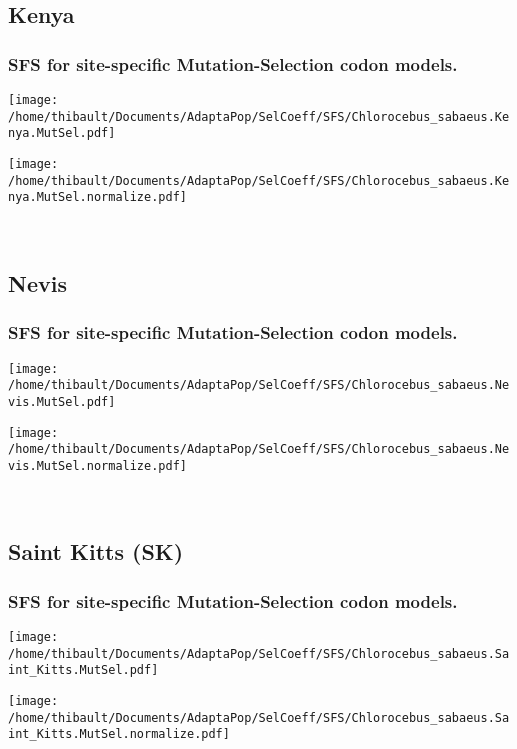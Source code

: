 \subsection{Kenya} 
 
\subsubsection*{SFS for site-specific Mutation-Selection codon models.} 
\begin{minipage}{0.49\linewidth} 
\texttt{[image: /home/thibault/Documents/AdaptaPop/SelCoeff/SFS/Chlorocebus\_sabaeus.Kenya.MutSel.pdf]} 
\end{minipage}
\begin{minipage}{0.49\linewidth}
\texttt{[image: /home/thibault/Documents/AdaptaPop/SelCoeff/SFS/Chlorocebus\_sabaeus.Kenya.MutSel.normalize.pdf]} 
\end{minipage}
\\ 
\subsection{Nevis} 
 
\subsubsection*{SFS for site-specific Mutation-Selection codon models.} 
\begin{minipage}{0.49\linewidth} 
\texttt{[image: /home/thibault/Documents/AdaptaPop/SelCoeff/SFS/Chlorocebus\_sabaeus.Nevis.MutSel.pdf]} 
\end{minipage}
\begin{minipage}{0.49\linewidth}
\texttt{[image: /home/thibault/Documents/AdaptaPop/SelCoeff/SFS/Chlorocebus\_sabaeus.Nevis.MutSel.normalize.pdf]} 
\end{minipage}
\\ 
\subsection{Saint Kitts (SK)} 
 
\subsubsection*{SFS for site-specific Mutation-Selection codon models.} 
\begin{minipage}{0.49\linewidth} 
\texttt{[image: /home/thibault/Documents/AdaptaPop/SelCoeff/SFS/Chlorocebus\_sabaeus.Saint\_Kitts.MutSel.pdf]} 
\end{minipage}
\begin{minipage}{0.49\linewidth}
\texttt{[image: /home/thibault/Documents/AdaptaPop/SelCoeff/SFS/Chlorocebus\_sabaeus.Saint\_Kitts.MutSel.normalize.pdf]} 
\end{minipage}
\\ 

